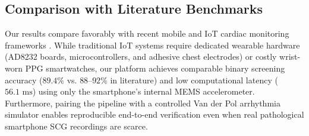\subsection{Comparison with Literature Benchmarks}
Our results compare favorably with recent mobile and IoT cardiac monitoring frameworks \cite{pandian2026internet, tsamis2017soft, inan2015ballistocardiography, tadi2016realtime}. While traditional IoT systems require dedicated wearable hardware (AD8232 boards, microcontrollers, and adhesive chest electrodes) or costly wrist-worn PPG smartwatches, our platform achieves comparable binary screening accuracy ($89.4\%$ vs. $88\text{--}92\%$ in literature) and low computational latency ($56.1\text{ ms}$) using only the smartphone's internal MEMS accelerometer. Furthermore, pairing the pipeline with a controlled Van der Pol arrhythmia simulator enables reproducible end-to-end verification even when real pathological smartphone SCG recordings are scarce.
